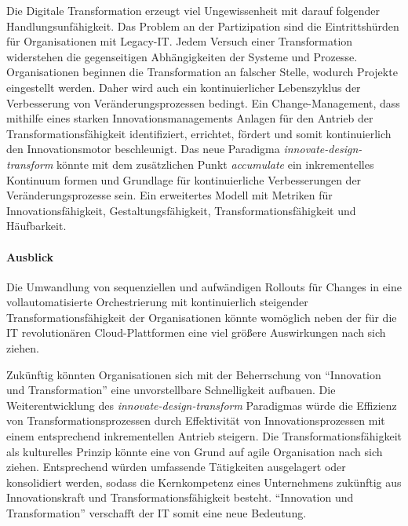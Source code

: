 Die Digitale Transformation erzeugt viel Ungewissenheit mit darauf folgender Handlungsunfähigkeit. Das Problem an der Partizipation sind die Eintrittshürden für Organisationen mit Legacy-IT. Jedem Versuch einer Transformation widerstehen die gegenseitigen Abhängigkeiten der Systeme und Prozesse. Organisationen beginnen die Transformation an falscher Stelle, wodurch Projekte eingestellt werden. Daher wird auch ein kontinuierlicher Lebenszyklus der Verbesserung von Veränderungsprozessen bedingt. Ein Change-Management, dass mithilfe eines starken Innovationsmanagements Anlagen für den Antrieb der Transformationsfähigkeit identifiziert, errichtet, fördert und somit kontinuierlich den Innovationsmotor beschleunigt.
Das neue Paradigma \emph{innovate-design-transform} könnte mit dem zusätzlichen Punkt \emph{accumulate} ein inkrementelles Kontinuum formen und Grundlage für kontinuierliche Verbesserungen der Veränderungsprozesse sein. Ein erweitertes Modell mit Metriken für Innovationsfähigkeit, Gestaltungsfähigkeit, Transformationsfähigkeit und Häufbarkeit.

\paragraph{Ausblick}

Die Umwandlung von sequenziellen und aufwändigen Rollouts für Changes in eine vollautomatisierte Orchestrierung mit kontinuierlich steigender Transformationsfähigkeit der Organisationen könnte womöglich neben der für die IT revolutionären Cloud-Plattformen eine viel größere Auswirkungen nach sich ziehen. 

Zukünftig könnten Organisationen sich mit der Beherrschung von \enquote{Innovation und Transformation} eine unvorstellbare Schnelligkeit aufbauen.
Die Weiterentwicklung des \emph{innovate-design-transform} Paradigmas würde die Effizienz von Transformationsprozessen durch Effektivität von Innovationsprozessen mit einem entsprechend inkrementellen Antrieb steigern. Die Transformationsfähigkeit als kulturelles Prinzip könnte eine von Grund auf agile Organisation nach sich ziehen. Entsprechend würden umfassende Tätigkeiten ausgelagert oder konsolidiert werden, sodass die Kernkompetenz eines Unternehmens zukünftig aus Innovationskraft und Transformationsfähigkeit besteht. \enquote{Innovation und Transformation} verschafft der IT somit eine neue Bedeutung.